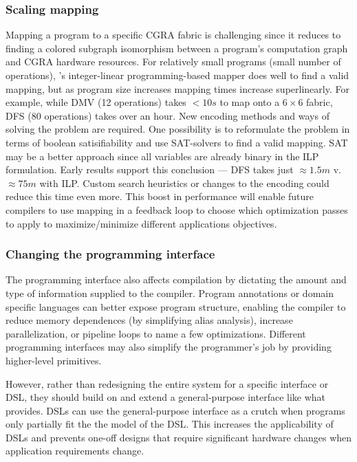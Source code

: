 \subsubsection{Scaling mapping}
Mapping a program to a specific CGRA fabric is challenging since it reduces to finding a colored subgraph isomorphism between a program's computation graph and CGRA hardware resources.
% 
For relatively small programs (small number of operations), \riptide's integer-linear programming-based mapper does well to find a valid mapping, but as program size increases mapping times increase superlinearly.
% 
For example, while DMV (12 operations) takes $<10s$ to map onto a $6\times6$ fabric, DFS (80 operations) takes over an hour.
% 
New encoding methods and ways of solving the problem are required.
% 
One possibility is to reformulate the problem in terms of boolean satisifiability and use SAT-solvers to find a valid mapping.
% 
SAT may be a better approach since all variables are already binary in the ILP formulation.
% 
Early results support this conclusion --- DFS takes just $\approx1.5m$ v. $\approx75m$ with ILP.
% 
Custom search heuristics or changes to the encoding could reduce this time even more.
% 
This boost in performance will enable future compilers to use mapping in a feedback loop to choose which optimization passes to apply to maximize/minimize different applications objectives.

\subsubsection{Changing the programming interface}
The programming interface also affects compilation by dictating the amount and type of information supplied to the compiler.
% 
Program annotations or domain specific languages can better expose program structure, enabling the compiler to reduce memory dependences (by simplifying alias analysis), increase parallelization, or pipeline loops to name a few optimizations. 
% 
Different programming interfaces may also simplify the programmer's job by providing higher-level primitives.

However, rather than redesigning the entire system for a specific interface or DSL, they should build on and extend a general-purpose interface like what \riptide provides.
% 
DSLs can use the general-purpose interface as a crutch when programs only partially fit the the model of the DSL.
% 
This increases the applicability of DSLs and prevents one-off designs that require significant hardware changes when application requirements change.

